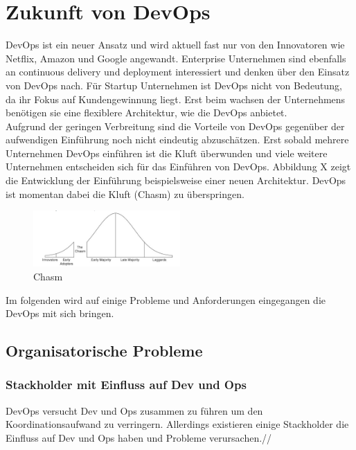 \chapter{Zukunft von DevOps}

DevOps ist ein neuer Ansatz und wird aktuell fast nur von den Innovatoren wie Netflix, Amazon und Google angewandt. Enterprise Unternehmen sind ebenfalls an continuous delivery und deployment interessiert und denken über den Einsatz von DevOps nach. Für Startup Unternehmen ist DevOps nicht von Bedeutung, da ihr Fokus auf Kundengewinnung liegt. Erst beim wachsen der Unternehmens benötigen sie eine flexiblere Architektur, wie die DevOps anbietet. \\
Aufgrund der geringen Verbreitung sind die Vorteile von DevOps gegenüber der aufwendigen Einführung noch nicht eindeutig abzuschätzen. Erst sobald mehrere Unternehmen DevOps einführen ist die Kluft überwunden und viele weitere Unternehmen entscheiden sich für das Einführen von DevOps. Abbildung X zeigt die Entwicklung der Einführung beispielsweise einer neuen Architektur. DevOps ist momentan dabei die Kluft (Chasm) zu überspringen. 

\begin{figure}[htbp]
  \centering
  \includegraphics[width=0.5\textwidth]{pictures/chasm.png}
	\caption{Chasm}
	\label{Chasm}
\end{figure} 

Im folgenden wird auf einige Probleme und Anforderungen eingegangen die DevOps mit sich  bringen.

\section{Organisatorische Probleme}

\subsection{Stackholder mit Einfluss auf Dev und Ops}
DevOps versucht Dev und Ops zusammen zu führen um den Koordinationsaufwand zu verringern. Allerdings existieren einige Stackholder die Einfluss auf Dev und Ops haben und Probleme verursachen.//

